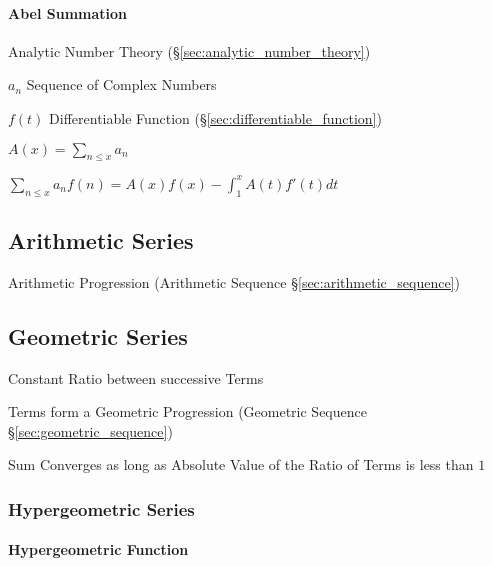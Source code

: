 \paragraph{Abel Summation}\label{sec:abel_summation}\hfill

Analytic Number Theory (\S\ref{sec:analytic_number_theory})

$a_n$ Sequence of Complex Numbers

$f(t)$ Differentiable Function (\S\ref{sec:differentiable_function})

$A(x) = \sum_{n \leq x} a_n$

$\sum_{n \leq x} a_n f(n) = A(x)f(x) - \int_1^x A(t)f'(t) dt$



\subsection{Arithmetic Series}\label{sec:arithmetic_series}

Arithmetic Progression (Arithmetic Sequence
\S\ref{sec:arithmetic_sequence})



\subsection{Geometric Series}\label{sec:geometric_series}

Constant Ratio between successive Terms

Terms form a Geometric Progression (Geometric Sequence
\S\ref{sec:geometric_sequence})

Sum Converges as long as Absolute Value of the Ratio of Terms is less
than $1$



\subsubsection{Hypergeometric Series}\label{sec:hypergeometric_series}

\paragraph{Hypergeometric Function}\label{sec:hypergeometric_function}\hfill

